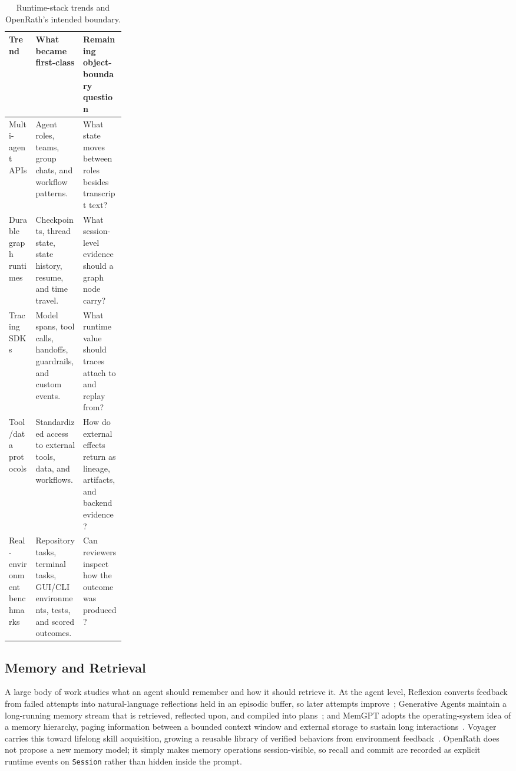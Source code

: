\begin{table}[H]
\vspace{0.2em}
\centering
\caption{Runtime-stack trends and OpenRath's intended boundary.}
\label{tab:related-runtime-landscape}
\begin{tabularx}{\linewidth}{@{}>{\raggedright\arraybackslash}p{0.23\linewidth}>{\raggedright\arraybackslash}X>{\raggedright\arraybackslash}X@{}}
\toprule
Trend & What became first-class & Remaining object-boundary question \\
\midrule
Multi-agent APIs & Agent roles, teams, group chats, and workflow patterns. & What state moves between roles besides transcript text? \\
Durable graph runtimes & Checkpoints, thread state, state history, resume, and time travel. & What session-level evidence should a graph node carry? \\
Tracing SDKs & Model spans, tool calls, handoffs, guardrails, and custom events. & What runtime value should traces attach to and replay from? \\
Tool/data protocols & Standardized access to external tools, data, and workflows. & How do external effects return as lineage, artifacts, and backend evidence? \\
Real-environment benchmarks & Repository tasks, terminal tasks, GUI/CLI environments, tests, and scored outcomes. & Can reviewers inspect how the outcome was produced? \\
\bottomrule
\end{tabularx}
\vspace{0.2em}
\end{table}

\subsection{Memory and Retrieval}

A large body of work studies what an agent should remember and how it should
retrieve it. At the agent level, Reflexion converts feedback from failed
attempts into natural-language reflections held in an episodic buffer, so later
attempts improve~\cite{reflexion}; Generative Agents maintain a long-running
memory stream that is retrieved, reflected upon, and compiled into
plans~\cite{generative-agents}; and MemGPT adopts the operating-system idea of a
memory hierarchy, paging information between a bounded context window and
external storage to sustain long interactions~\cite{memgpt}. Voyager carries
this toward lifelong skill acquisition, growing a reusable library of verified
behaviors from environment feedback~\cite{voyager}. OpenRath does not propose a new memory model; it simply makes memory operations session-visible, so recall and commit are recorded as explicit runtime events on \texttt{Session} rather than hidden inside the prompt.


